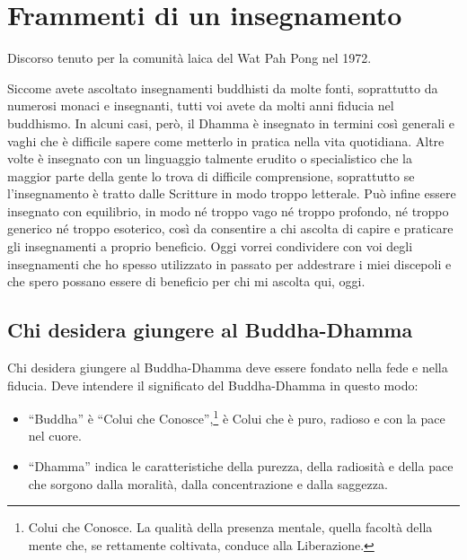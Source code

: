 \chapter{Frammenti di un insegnamento}

\begin{openingQuote}
  \centering

  Discorso tenuto per la comunità laica del Wat Pah Pong nel 1972.
\end{openingQuote}

Siccome avete ascoltato insegnamenti buddhisti da molte fonti,
soprattutto da numerosi monaci e insegnanti, tutti voi avete da molti
anni fiducia nel buddhismo. In alcuni casi, però, il Dhamma è insegnato
in termini così generali e vaghi che è difficile sapere come metterlo in
pratica nella vita quotidiana. Altre volte è insegnato con un linguaggio
talmente erudito o specialistico che la maggior parte della gente lo
trova di difficile comprensione, soprattutto se l'insegnamento è tratto
dalle Scritture in modo troppo letterale. Può infine essere insegnato
con equilibrio, in modo né troppo vago né troppo profondo, né troppo
generico né troppo esoterico, così da consentire a chi ascolta di capire
e praticare gli insegnamenti a proprio beneficio. Oggi vorrei
condividere con voi degli insegnamenti che ho spesso utilizzato in
passato per addestrare i miei discepoli e che spero possano essere di
beneficio per chi mi ascolta qui, oggi.

\section{Chi desidera giungere al Buddha-Dhamma}

Chi desidera giungere al Buddha-Dhamma deve essere fondato nella fede e
nella fiducia. Deve intendere il significato del Buddha-Dhamma in questo
modo:

\begin{itemize}

\item ``Buddha'' è ``Colui che Conosce'',\footnote{Colui che Conosce. La qualità
    della presenza mentale, quella facoltà della mente che, se rettamente
    coltivata, conduce alla Liberazione.} è Colui che è puro, radioso e con la
  pace nel cuore.

\item ``Dhamma'' indica le caratteristiche della purezza, della radiosità e
  della pace che sorgono dalla moralità, dalla concentrazione e dalla saggezza.

\end{itemize}

